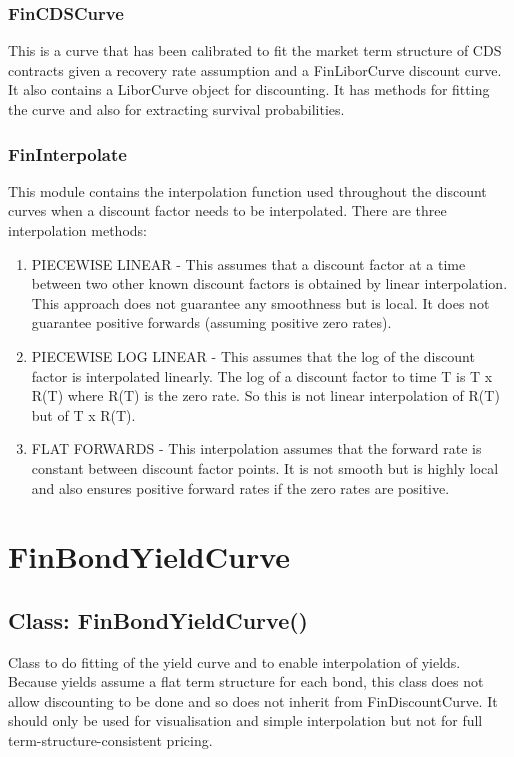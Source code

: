 \documentclass[twoside,11pt]{book}
\begin{document}
\subsubsection*{FinCDSCurve}
This is a curve that has been calibrated to fit the market term structure of CDS contracts given a recovery rate assumption and a FinLiborCurve discount curve. It also contains a LiborCurve object for discounting. It has methods for fitting the curve and also for extracting survival probabilities.


\subsubsection*{FinInterpolate}
This module contains the interpolation function used throughout the discount curves when a discount factor needs to be interpolated. There are three interpolation methods:

\begin{enumerate}
\item{ PIECEWISE LINEAR - This assumes that a discount factor at a time between two other known discount factors is obtained by linear interpolation. This approach does not guarantee any smoothness but is local. It does not guarantee positive forwards (assuming positive zero rates).
}
\item{ PIECEWISE LOG LINEAR - This assumes that the log of the discount factor is interpolated linearly. The log of a discount factor to time T is T x R(T) where R(T) is the zero rate. So this is not linear interpolation of R(T) but of T x R(T).
}
\item{ FLAT FORWARDS - This interpolation assumes that the forward rate is constant between discount factor points. It is not smooth but is highly local and also ensures positive forward rates if the zero rates are positive.
}
\end{enumerate}
\newpage
\section{FinBondYieldCurve}

\subsection*{Class: FinBondYieldCurve()}
Class to do fitting of the yield curve and to enable interpolation of  yields. Because yields assume a flat term structure for each bond, this  class does not allow discounting to be done and so does not inherit from  FinDiscountCurve. It should only be used for visualisation and simple  interpolation but not for full term-structure-consistent pricing.  
\end{document}

